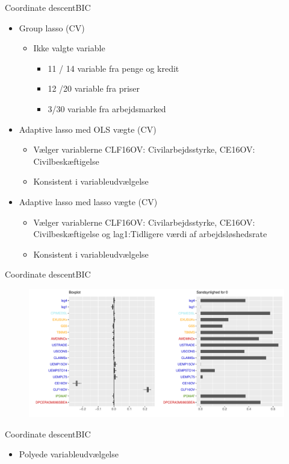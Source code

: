 \begin{frame}{Coordinate descent}{BIC}
\begin{itemize}
\item Group lasso (CV)
\begin{itemize}
\item Ikke valgte variable 
\begin{itemize}
\item 11 / 14 variable fra penge og kredit
\item 12 /20 variable fra priser
\item 3/30 variable fra arbejdsmarked
\end{itemize} 
\end{itemize}
\item Adaptive lasso med OLS vægte (CV)
\begin{itemize}
\item Vælger variablerne \textcolor{blue3}{CLF16OV}: Civilarbejdsstyrke,   \textcolor{blue3}{CE16OV}: Civilbeskæftigelse   
\item Konsistent i variableudvælgelse
\end{itemize}
\item Adaptive lasso med lasso vægte (CV)
\begin{itemize}
\item Vælger variablerne \textcolor{blue3}{CLF16OV}: Civilarbejdsstyrke,   \textcolor{blue3}{CE16OV}: Civilbeskæftigelse og \textcolor{blue3}{lag1}:Tidligere værdi af arbejdsløshedsrate
\item Konsistent i variableudvælgelse
\end{itemize}
\end{itemize}
\end{frame}

\begin{frame}{Coordinate descent}{BIC}
\begin{figure}[!htb]
        \includegraphics[width=1\linewidth, height=0.7\textheight]{slides/boxplot_lasso_coord_bic.pdf}
\end{figure}
\end{frame}

\begin{frame}{Coordinate descent}{BIC}
\begin{itemize}
\item Polyede variableudvælgelse 
\end{itemize}

\end{frame}
